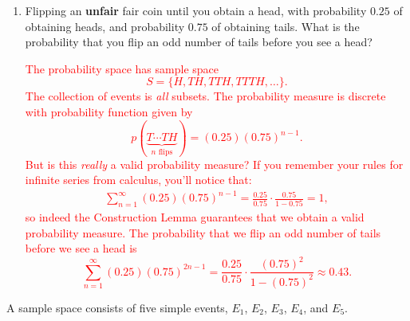 \documentclass[12pt,reqno]{amsart}
\begin{document}
\begin{enumerate}
    \item Flipping an \textbf{unfair} fair coin until you obtain a head, with probability $0.25$ of obtaining heads, and probability $0.75$ of obtaining tails. What is the probability that you flip an odd number of tails before you see a head?
    
    \bigskip
    \textcolor{red}{The probability space has sample space
        \[S = \{ H, TH, TTH, TTTH, \ldots\}.\]
    The collection of events is \textit{all} subsets. The probability measure is discrete with probability function given by
        \[p(\underbrace{T\cdots TH}_{\text{$n$ flips}}) = (0.25)(0.75)^{n-1}.\]
    But is this \textit{really} a valid probability measure? If you remember your rules for infinite series from calculus, you'll notice that:
        \begin{align*}
        \sum_{n=1}^\infty (0.25)(0.75)^{n-1} = \frac{0.25}{0.75} \cdot \frac{0.75}{1-0.75} = 1,
        \end{align*}
    so indeed the Construction Lemma guarantees that we obtain a valid probability measure. The probability that we flip an odd number of tails before we see a head is
        \[\sum_{n=1}^\infty (0.25)(0.75)^{2n-1} = \frac{0.25}{0.75} \cdot \frac{(0.75)^2}{1-(0.75)^2} \approx 0.43. \]}
\end{enumerate}

















\bigskip
\prob A sample space consists of five simple events, $E_1$, $E_2$, $E_3$, $E_4$, and $E_5$.
\end{document}
